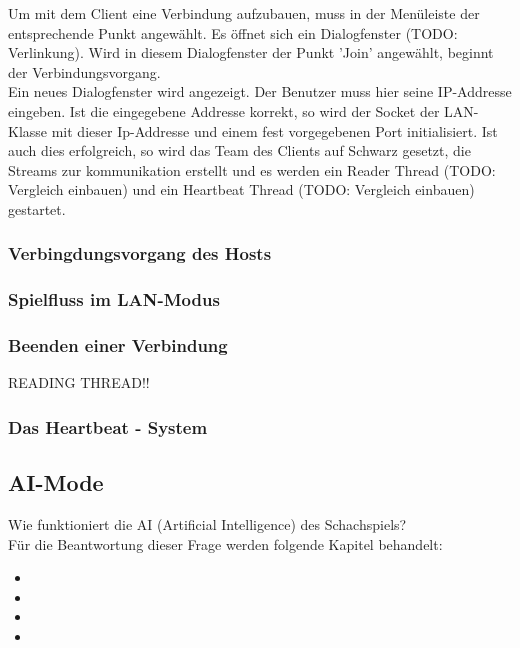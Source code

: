 \documentclass[12pt,a4paper]{article}
\begin{document}
{Um mit dem Client eine Verbindung aufzubauen, muss in der Menüleiste der entsprechende Punkt angewählt. Es öffnet sich ein Dialogfenster (TODO: Verlinkung). Wird in diesem Dialogfenster der Punkt 'Join' angewählt, beginnt der Verbindungsvorgang. \\[2ex]
Ein neues Dialogfenster wird angezeigt. Der Benutzer muss hier seine IP-Addresse eingeben. 
Ist die eingegebene Addresse korrekt, so wird der Socket der LAN-Klasse mit dieser Ip-Addresse und einem fest vorgegebenen Port initialisiert. 
Ist auch dies erfolgreich, so wird das Team des Clients auf Schwarz gesetzt, die Streams zur kommunikation erstellt und es werden ein Reader Thread (TODO: Vergleich einbauen) und ein Heartbeat Thread (TODO: Vergleich einbauen) gestartet.\\[2ex]


\subsubsection{Verbingdungsvorgang des Hosts}

\subsubsection{Spielfluss im LAN-Modus}

\subsubsection{Beenden einer Verbindung}

\label{SUBSUBSEC: READTHREAD}
READING THREAD!!


\subsubsection{Das Heartbeat - System}
\label{SUBSUBSEC: HEARTBEAT}

\newpage

\subsection{AI-Mode}
\label{SUBSEC:AI-MODE}

Wie funktioniert die AI (Artificial Intelligence) des Schachspiels? \\
Für die Beantwortung dieser Frage werden folgende Kapitel behandelt:

\begin{itemize}
	\item{}
	\item{}
	\item{}
	\item{}
\end{itemize}



}
\end{document}
